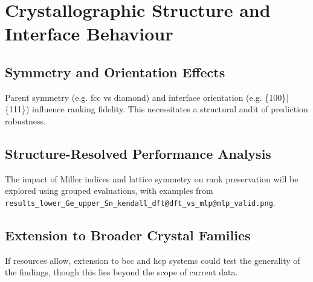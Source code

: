 \section{Crystallographic Structure and Interface Behaviour}

\subsection{Symmetry and Orientation Effects}

Parent symmetry (e.g. fcc vs diamond) and interface orientation (e.g. \{100\}|\{111\}) influence ranking fidelity. This necessitates a structural audit of prediction robustness.

\subsection{Structure-Resolved Performance Analysis}

The impact of Miller indices and lattice symmetry on rank preservation will be explored using grouped evaluations, with examples from \texttt{results\_lower\_Ge\_upper\_Sn\_kendall\_dft@dft\_vs\_mlp@mlp\_valid.png}.


\subsection{Extension to Broader Crystal Families}

If resources allow, extension to bcc and hcp systems could test the generality of the findings, though this lies beyond the scope of current data.